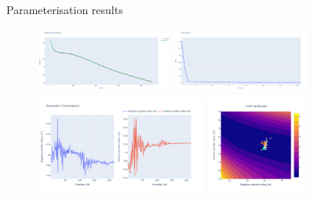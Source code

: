 \documentclass[aspectratio=169]{beamer}
\begin{document}
\begin{frame}{Parameterisation results}
    \vspace{-6mm}
    \begin{figure}
        \centering
        \includegraphics[width=0.4\textwidth, trim={0 0 0 0},clip]{Images/Examples/CMAES_quick_plot.png}
        \includegraphics[width=0.4\textwidth, trim={0 0 0 0},clip]{Images/Examples/CMAES_convergence.png} \\
        \includegraphics[width=0.5\textwidth, trim={0 0 0 0},clip]{Images/Examples/CMAES_parameters.png}
        \hspace{1cm}\includegraphics[width=0.29\textwidth, trim={0 0 0 0},clip]{Images/Examples/CMAES_cost_trace.png}
        \hspace{1cm}
        \label{fig:parameterisation}
    \end{figure}
\end{frame}
\end{document}

